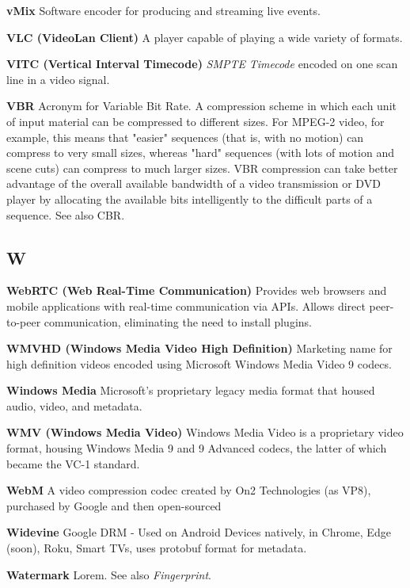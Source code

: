 \smallskip
\textbf{vMix}
Software encoder for producing and streaming live events.

\smallskip
\textbf{VLC (VideoLan Client)}
A player capable of playing a wide variety of formats.

\smallskip
\textbf{VITC (Vertical Interval Timecode)}
\textit{SMPTE} \textit{Timecode} encoded on one scan line in a video signal.

\smallskip
\textbf{VBR}
Acronym for Variable Bit Rate. A compression scheme in which each unit of input material can be compressed to different sizes. For MPEG-2 video, for example, this means that "easier" sequences (that is, with no motion) can compress to very small sizes, whereas "hard" sequences (with lots of motion and scene cuts) can compress to much larger sizes. VBR compression can take better advantage of the overall available bandwidth of a video transmission or DVD player by allocating the available bits intelligently to the difficult parts of a sequence. See also CBR.


\subsection{W}

\smallskip
\textbf{WebRTC (Web Real-Time Communication)}
Provides web browsers and mobile applications with real-time communication via APIs. Allows direct peer-to-peer communication, eliminating the need to install plugins.

\smallskip
\textbf{WMVHD (Windows Media Video High Definition)}
Marketing name for high definition videos encoded using Microsoft Windows Media Video 9 codecs.

\smallskip
\textbf{Windows Media}
Microsoft's proprietary legacy media format that housed audio, video, and metadata.

\smallskip
\textbf{WMV (Windows Media Video)}
Windows Media Video is a proprietary video format, housing Windows Media 9 and 9 Advanced codecs, the latter of which became the VC-1 standard.

\smallskip
\textbf{WebM}
A video compression codec created by On2 Technologies (as VP8), purchased by Google and then open-sourced

\smallskip
\textbf{Widevine}
Google DRM - Used on Android Devices natively, in Chrome, Edge (soon), Roku, Smart TVs, uses protobuf format for metadata.

\smallskip
\textbf{Watermark}
Lorem. See also \textit{Fingerprint}.

